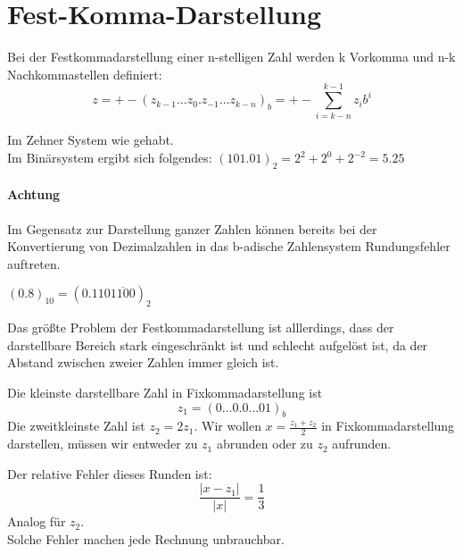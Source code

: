 \section{Fest-Komma-Darstellung}
\begin{definition}
	Bei der Festkommadarstellung einer n-stelligen Zahl werden k Vorkomma und n-k Nachkommastellen definiert:
	\[
	z=+-(z_{k-1} \ldots z_0.z_{-1} \ldots z_{k-n})_b = +- \sum_{i=k-n}^{k-1}z_i b^{i}
	\]

\end{definition}
\begin{example}
Im Zehner System wie gehabt.\\
Im Binärsystem ergibt sich folgendes: $(101.01)_2= 2^{2}+ 2^{0}+ 2^{-2}=5.25$
\end{example}
\paragraph{Achtung} Im Gegensatz zur Darstellung ganzer Zahlen können bereits bei der Konvertierung von Dezimalzahlen in das b-adische Zahlensystem Rundungsfehler auftreten.
\begin{example}
	$(0.8)_{10}=(0.110\overline{1100})_2$
\end{example}
Das größte Problem der Festkommadarstellung ist alllerdings, dass der darstellbare Bereich stark eingeschränkt ist und schlecht aufgelöst ist, da der Abstand zwischen zweier Zahlen immer gleich ist.
\begin{example}
Die kleinste darstellbare Zahl in Fixkommadarstellung ist \[
z_1=(0 \ldots 0.0 \ldots 0 1)_b
\]
Die zweitkleinste Zahl ist $z_2=2z_1$. Wir wollen $x=\frac{z_1+z_2}{2}$ in Fixkommadarstellung darstellen, müssen wir entweder zu $z_1$ abrunden oder zu $z_2$ aufrunden.
\end{example}
\begin{fluff}
Der relative Fehler dieses Runden ist:
\[
\frac{|x-z_1|}{|x|}=\frac{1}{3}
\]
Analog für $z_2$. \\
Solche Fehler machen jede Rechnung unbrauchbar.
\end{fluff}